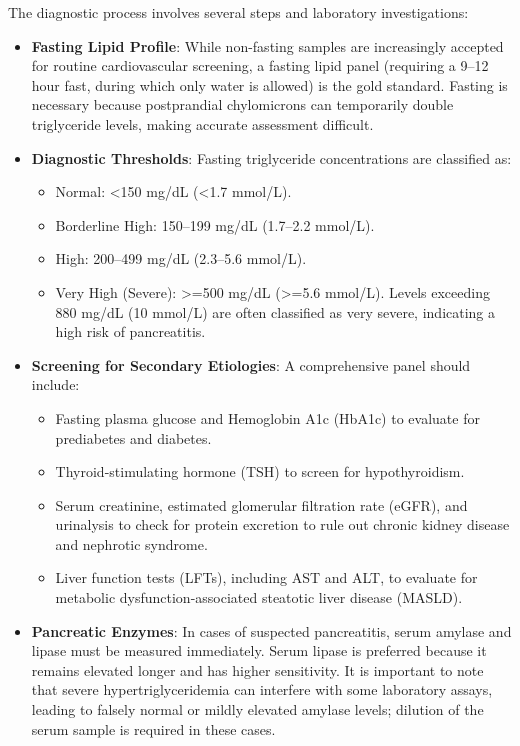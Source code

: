 The diagnostic process involves several steps and laboratory investigations:
\begin{itemize}
    \item \textbf{Fasting Lipid Profile}: While non-fasting samples are increasingly accepted for routine cardiovascular screening, a fasting lipid panel (requiring a 9--12 hour fast, during which only water is allowed) is the gold standard. Fasting is necessary because postprandial chylomicrons can temporarily double triglyceride levels, making accurate assessment difficult.
    \item \textbf{Diagnostic Thresholds}: Fasting triglyceride concentrations are classified as:
    \begin{itemize}
        \item Normal: <150 mg/dL (<1.7 mmol/L).
        \item Borderline High: 150--199 mg/dL (1.7--2.2 mmol/L).
        \item High: 200--499 mg/dL (2.3--5.6 mmol/L).
        \item Very High (Severe): >=500 mg/dL (>=5.6 mmol/L). Levels exceeding 880 mg/dL (10 mmol/L) are often classified as very severe, indicating a high risk of pancreatitis.
    \end{itemize}
    \item \textbf{Screening for Secondary Etiologies}: A comprehensive panel should include:
    \begin{itemize}
        \item Fasting plasma glucose and Hemoglobin A1c (HbA1c) to evaluate for prediabetes and diabetes.
        \item Thyroid-stimulating hormone (TSH) to screen for hypothyroidism.
        \item Serum creatinine, estimated glomerular filtration rate (eGFR), and urinalysis to check for protein excretion to rule out chronic kidney disease and nephrotic syndrome.
        \item Liver function tests (LFTs), including AST and ALT, to evaluate for metabolic dysfunction-associated steatotic liver disease (MASLD).
    \end{itemize}
    \item \textbf{Pancreatic Enzymes}: In cases of suspected pancreatitis, serum amylase and lipase must be measured immediately. Serum lipase is preferred because it remains elevated longer and has higher sensitivity. It is important to note that severe hypertriglyceridemia can interfere with some laboratory assays, leading to falsely normal or mildly elevated amylase levels; dilution of the serum sample is required in these cases.

\end{itemize}
